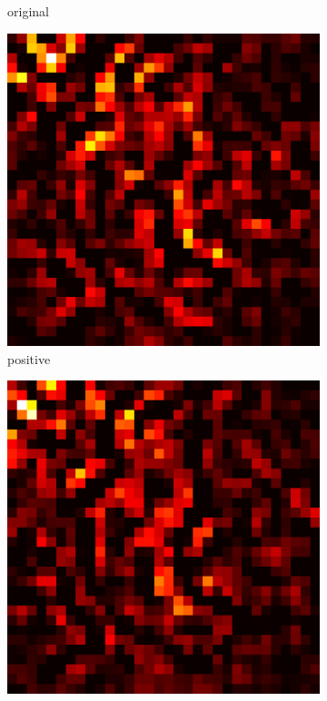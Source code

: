 \documentclass[preprint,12pt]{elsarticle}
\begin{document}
\begin{figure}
\begin{subfigure}{0.14\linewidth}
        \caption{original}
    \end{subfigure}
    \hfill
    \begin{subfigure}{0.14\textwidth}
        \centering
        \includegraphics[width=\linewidth]{../visualizations/examples/cifar10/resnet18/positive_saliency_map/2.png}
        \caption{positive}
    \end{subfigure}
    \hfill
    \begin{subfigure}{0.14\textwidth}
        \centering
        \includegraphics[width=\linewidth]{../visualizations/examples/cifar10/resnet18/negative_saliency_map/2.png}

\end{subfigure}
\end{figure}
\end{document}
